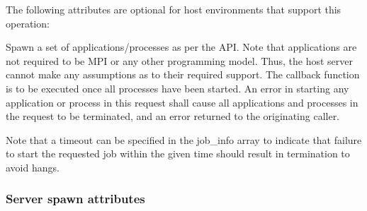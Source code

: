 
\reqattrend

\optattrstart
The following attributes are optional for host environments that support this operation:


\optattrend

\descr

Spawn a set of applications/processes as per the  API.
Note that applications are not required to be \ac{MPI} or any other programming model.
Thus, the host server cannot make any assumptions as to their required support.
The callback function is to be executed once all processes have been started.
An error in starting any application or process in this request shall cause all applications and processes in the request to be terminated, and an error returned to the originating caller.

Note that a timeout can be specified in the job_info array to indicate that failure to start the requested job within the given time should result in termination to avoid hangs.

\subsubsection{Server spawn attributes}

